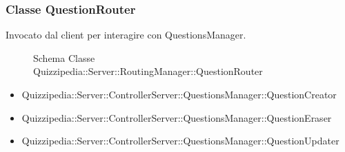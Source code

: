 \subsubsection{Classe QuestionRouter}
Invocato dal client per interagire con QuestionsManager.
\begin{figure}[H]
\centering
\noindent{}
\caption{Schema Classe Quizzipedia::Server::RoutingManager::QuestionRouter}
\end{figure}
\begin{itemize}
\item Quizzipedia::Server::ControllerServer::QuestionsManager::QuestionCreator
\item Quizzipedia::Server::ControllerServer::QuestionsManager::QuestionEraser
\item Quizzipedia::Server::ControllerServer::QuestionsManager::QuestionUpdater
\end{itemize}
